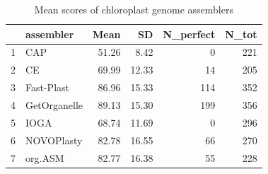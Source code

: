 \documentclass{bmcart}
\begin{document}
\begin{backmatter}
\begin{table}[ht]
\caption{Mean scores of chloroplast genome assemblers}
\label{tab:scores}
\centering
\begin{tabular}{rlrrrr}
  \hline
 & assembler & Mean & SD & N\_perfect & N\_tot \\ 
  \hline
  1 & CAP & 51.26 & 8.42 &   0 & 221 \\ 
  2 & CE & 69.99 & 12.33 &  14 & 205 \\ 
  3 & Fast-Plast & 86.96 & 15.33 & 114 & 352 \\ 
  4 & GetOrganelle & 89.13 & 15.30 & 199 & 356 \\ 
  5 & IOGA & 68.74 & 11.69 &   0 & 296 \\ 
  6 & NOVOPlasty & 82.78 & 16.55 &  66 & 270 \\ 
  7 & org.ASM & 82.77 & 16.38 &  55 & 228 \\ 
   \hline
\end{tabular}
\end{table}



\end{backmatter}
\end{document}
